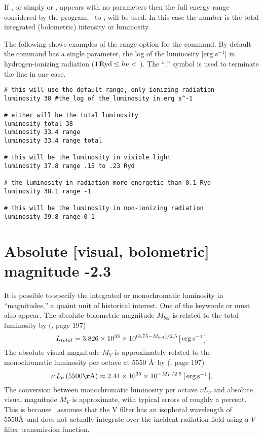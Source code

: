 If , or simply  or ,
appears with no parameters then the
full energy range considered by the program,
\emm\ to
\egamry , will be used.
In this case the number is the total integrated (bolometric) intensity
or luminosity.

The following shows examples of the range option for the
 command.
By default the  command has a single parameter,
the log of the luminosity [erg s$^{-1}$] in hydrogen-ionizing
radiation ($1 {\rm\thinspace Ryd} \le  h\nu <$ \egamry ).
The ``;'' symbol is used to terminate the line in one
case.
\begin{verbatim}
# this will use the default range, only ionizing radiation
luminosity 38 #the log of the luminosity in erg s^-1

# either will be the total luminosity
luminosity total 38
luminosity 33.4 range
luminosity 33.4 range total

# this will be the luminosity in visible light
luminosity 37.8 range .15 to .23 Ryd

# the luminosity in radiation more energetic than 0.1 Ryd
luminosity 38.1 range -1

# this will be the luminosity in non-ionizing radiation
luminosity 39.8 range 0 1
\end{verbatim}

\section{Absolute [visual, bolometric] magnitude -2.3}

It is possible to specify the integrated or monochromatic luminosity
in ``magnitudes,'' a quaint unit of historical interest.
One of the keywords
 or  must also appear.
The absolute bolometric magnitude
$M_{bol}$ is related to the total luminosity by (\citealp{Allen1976}, page 197)
\begin{equation}
L_{total}  = 3.826 \times 10^{33}  \times 10^{\left( {4.75 - M_{bol} }
\right)/2.5}\,
 [\mbox{${\rm\thinspace erg}{\rm\thinspace s}^{-1}\,$}].
\end{equation}
The absolute visual magnitude $M_V$ is approximately related to the
monochromatic luminosity per octave at 5550 \AA\
by (\citealp{Allen1976}, page 197)
\begin{equation}
\nu \,L_\nu  \left( 5500\mathrm{\AA}\right) \approx 2.44 \times 10^{35}
\times 10^{ - M_V /2.5}\,
[\ergps].
\end{equation}
The conversion between monochromatic luminosity per octave $\nu L_{\nu}$ and absolute
visual magnitude $M_V$ is approximate,
with typical errors of roughly a percent.
This is because \Cloudy\ assumes that the V filter has an
isophotal wavelength of 5550\AA\ and does not actually integrate
over the incident radiation field using
a $V$-filter transmission function.

